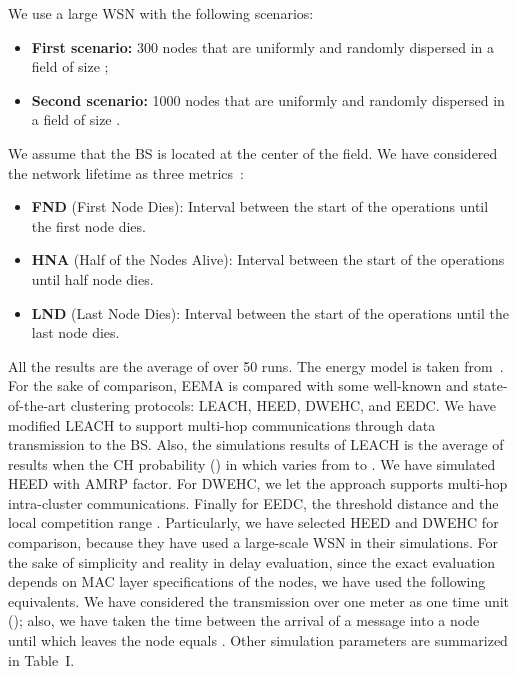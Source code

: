 \documentclass[journal]{IEEEtran}
\begin{document}
We use a large WSN with the following scenarios:
\begin{itemize}
\item {\bf First scenario:}  300 nodes that are uniformly and randomly dispersed in a field of size ;

\item  {\bf Second scenario:} 1000 nodes that are uniformly and randomly dispersed in a field of size .

\end{itemize}
We assume that the BS is located at the center of the field.  We have considered the network lifetime as three metrics~\cite{handy2002}:
\begin{itemize}
 
\item {\bf FND} (First Node Dies): Interval between the start of the operations until the first node dies.
\item {\bf HNA} (Half of the Nodes Alive): Interval between the start of the operations until half node dies.
\item {\bf LND} (Last Node Dies): Interval between the start of the operations until the last node dies.

\end{itemize}
 All the results are the average of over 50 runs.  The energy model is taken from~\cite{Heinzelman2002}.  For the sake of comparison, EEMA is compared with some well-known and state-of-the-art clustering protocols: LEACH, HEED, DWEHC, and EEDC.  We have modified LEACH to support multi-hop communications through data transmission to the BS.  Also, the simulations results of LEACH is the average of results when the CH probability () in which varies from  to .  We have simulated HEED with AMRP factor.  For DWEHC, we let the approach supports multi-hop intra-cluster communications.  Finally for EEDC, the threshold distance  and the local competition range .
 Particularly, we have selected HEED and DWEHC for comparison, because they have used a large-scale WSN in their simulations.  For the sake of simplicity and reality in delay evaluation, since the exact evaluation depends on MAC layer specifications of the nodes, we have used the following equivalents.  We have considered the transmission over one meter as one time unit (); also, we have taken the time between the arrival of a message into a node until which leaves the node equals .  Other simulation parameters are summarized in Table~I.
\end{document}
